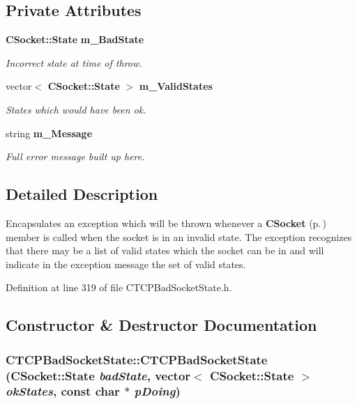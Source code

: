 \subsection*{Private Attributes}
\begin{CompactItemize}
\item 
{\bf CSocket::State} {\bf m\_\-Bad\-State}
\begin{CompactList}\small\item\em Incorrect state at time of throw.\item\end{CompactList}\item 
vector$<$ {\bf CSocket::State} $>$ {\bf m\_\-Valid\-States}
\begin{CompactList}\small\item\em States which would have been ok.\item\end{CompactList}\item 
string {\bf m\_\-Message}
\begin{CompactList}\small\item\em Full error message built up here.\item\end{CompactList}\end{CompactItemize}


\subsection{Detailed Description}
Encapsulates an exception which will be thrown whenever a {\bf CSocket} {\rm (p.\,\pageref{classCSocket})} member is called when the socket is in an invalid state. The exception recognizes that there may be a list of valid states which the socket can be in and will indicate in the exception message the set of valid states. 



Definition at line 319 of file CTCPBad\-Socket\-State.h.

\subsection{Constructor \& Destructor Documentation}
\subsubsection{\setlength{\rightskip}{0pt plus 5cm}CTCPBad\-Socket\-State::CTCPBad\-Socket\-State ({\bf CSocket::State} {\em bad\-State}, vector$<$ {\bf CSocket::State} $>$ {\em ok\-States}, const char $\ast$ {\em p\-Doing})}\label{classCTCPBadSocketState_a0}


